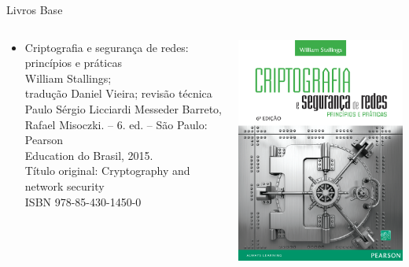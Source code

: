 \begin{frame}{Livros Base}
  \centering
  \begin{columns}
    \begin{column}{0.5\linewidth}
      \begin{itemize}
        \item Criptografia e segurança de redes: princípios e práticas \\ William
              Stallings;\\ tradução Daniel Vieira; revisão técnica Paulo Sérgio Licciardi
              Messeder Barreto, Rafael Misoczki. – 6. ed. – São Paulo: Pearson
              \\Education do Brasil, 2015.
              \\Título original: Cryptography and network security
              \\ISBN 978-85-430-1450-0
      \end{itemize}
    \end{column}
    \begin{column}{0.5\linewidth}
      \includegraphics[width=0.8\linewidth]{Figuras/livro-stallings-cripto.png}
    \end{column}
  \end{columns}

\end{frame}

